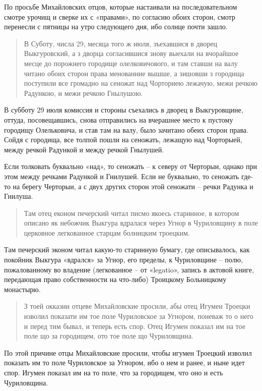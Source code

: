 По просьбе Михайловских отцов, которые настаивали на последовательном смотре урочищ и сверке их с «правами», по согласию обоих сторон, смотр перенесли с пятницы на утро следующего дня, ибо солнце почти зашло.

\begin{quotation}
В Суботу, числа 29, месяца того ж июля, зъехавшися в дворец Выкгуровский, а з дворца согласившися знову выехали на вчорайшое месце до порожнего городище олелковичового, и там ставши на валу читано обоих сторон права менованние вышше, а зишовши з городища поступили все громадно на сеножат над Чорториею лежачую, межи речкою Радункою, и межи речкою Гнылушою.
\end{quotation}

В субботу 29 июля комиссия и стороны съехались в дворец в Выкгуровщине, оттуда, посовещавшись, снова отправились на вчерашнее место к пустому городищу Олельковича, и став там на валу, было зачитано обеих сторон права. Сойдя с городища, все толпой пошли на сеножать, лежащую над Чорторыей, между речкой Радункой и между речкой Гнылушей.

Если толковать буквально «над», то сеножать – к северу от Черторыи, однако при этом между речками Радункой и Гнилушей. Если не буквально, то сеножать где-то на берегу Черторыи, а с двух других сторон этой сеножати – речки Радунка и Гнилуша.

\begin{quotation}
Там отец економ печерский читал писмо якоесь старинное, в котором описано як небожчик Выкгура вдралася через Угнор в Чуриловщину в поле церковное легкованное старцам болницким троецким.
\end{quotation}

Там печерский эконом читал какую-то старинную бумагу, где описывалось, как покойник Выкгура «вдрался» за Угнор, его пределы, к Чуриловщине – полю, пожалованному во владение (легкованное – от «legatio», запись в актовой книге, передающая право собственности на что-либо) Троицкому Больницкому монастырю.

\begin{quotation}
З тоей окказии отцеве Михайловские просили, абы отец Игумен Троецки изволил показати им тое поле Чуриловское за Угнором, поневаж то о него и перед тим бывал, и теперь есть спор. Отец Игумен показал им на тое поле що за городищем, ото тое поле що Чуриловщина. 
\end{quotation}

По этой причине отцы Михайловские просили, чтобы игумен Троецкий изволил показать им то поле Чуриловское за Угнором, ибо о нем и ранее, и ныне идет спор. Игумен показал им на то поле, что за городищем, что оно и есть Чуриловщина.

